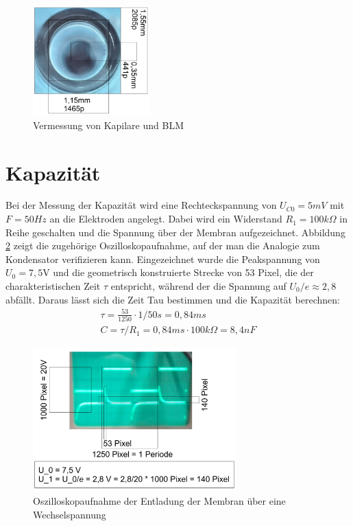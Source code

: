 \documentclass{include/thesisclass3}
\begin{document}
\begin{figure}[ht]
	\begin{center}
		\includegraphics[width=0.4\textwidth]{images/Perle2.png}
		\caption{Vermessung von Kapilare und BLM}
		\label{Perle}
	\end{center}
\end{figure}

\section{Kapazität}
Bei der Messung der Kapazität wird eine Rechteckspannung von $U_{C0}=5mV$ mit $F=50Hz$ an die Elektroden angelegt. Dabei wird ein Widerstand $R_1=100k\Omega$ in Reihe geschalten und die Spannung über der Membran aufgezeichnet. Abbildung \ref{oszi} zeigt die zugehörige Oszilloskopaufnahme, auf der man die Analogie zum Kondensator verifizieren kann. Eingezeichnet wurde die Peakspannung von $U_0 = 7,5$V und die geometrisch konstruierte Strecke von 53 Pixel, die der charakteristischen Zeit $\tau$ entspricht, während der die Spannung auf $U_0/\textit{e}\approx 2,8$ abfällt. Daraus lässt sich die Zeit Tau bestimmen und die Kapazität berechnen:
\begin{align*}
\tau = \frac{53}{1250} \cdot 1/50 s= 0,84 ms\\
C=\tau / R_1 = 0,84ms \cdot 100k\Omega = 8,4 nF
\end{align*}
\begin{figure}[ht]
	\begin{center}
		\includegraphics[width=0.7\textwidth]{images/measure.png}
		\caption{Oszilloskopaufnahme der Entladung der Membran über eine Wechselspannung}
		\label{oszi}
	\end{center}
\end{figure}
\end{document}
